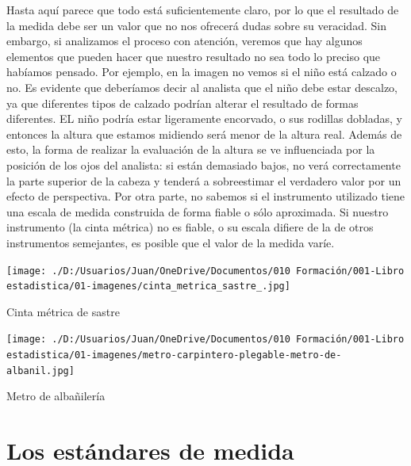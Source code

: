 \documentclass[
  letterpaper,
]{scrbook}
\begin{document}
Hasta aquí parece que todo está suficientemente claro, por lo que el
resultado de la medida debe ser un valor que no nos ofrecerá dudas sobre
su veracidad. Sin embargo, si analizamos el proceso con atención,
veremos que hay algunos elementos que pueden hacer que nuestro resultado
no sea todo lo preciso que habíamos pensado. Por ejemplo, en la imagen
no vemos si el niño está calzado o no. Es evidente que deberíamos decir
al analista que el niño debe estar descalzo, ya que diferentes tipos de
calzado podrían alterar el resultado de formas diferentes. EL niño
podría estar ligeramente encorvado, o sus rodillas dobladas, y entonces
la altura que estamos midiendo será menor de la altura real. Además de
esto, la forma de realizar la evaluación de la altura se ve influenciada
por la posición de los ojos del analista: si están demasiado bajos, no
verá correctamente la parte superior de la cabeza y tenderá a
sobreestimar el verdadero valor por un efecto de perspectiva. Por otra
parte, no sabemos si el instrumento utilizado tiene una escala de medida
construida de forma fiable o sólo aproximada. Si nuestro instrumento (la
cinta métrica) no es fiable, o su escala difiere de la de otros
instrumentos semejantes, es posible que el valor de la medida varíe.

\begin{marginfigure}

{\centering \texttt{[image: ./D:/Usuarios/Juan/OneDrive/Documentos/010 Formación/001-Libro estadistica/01-imagenes/cinta\_metrica\_sastre\_.jpg]}

}

\caption{Cinta métrica de sastre}

\end{marginfigure}

\begin{marginfigure}

{\centering \texttt{[image: ./D:/Usuarios/Juan/OneDrive/Documentos/010 Formación/001-Libro estadistica/01-imagenes/metro-carpintero-plegable-metro-de-albanil.jpg]}

}

\caption{Metro de albañilería}

\end{marginfigure}

\hypertarget{los-estuxe1ndares-de-medida}{%
\section{Los estándares de medida}\label{los-estuxe1ndares-de-medida}}
\end{document}
